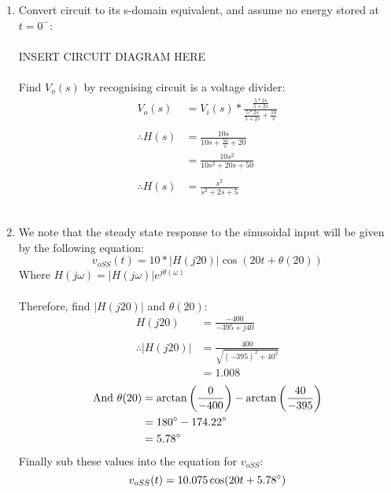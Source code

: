 \begin{enumerate}
	
	\item{
		Convert circuit to its s-domain equivalent, and assume no energy stored at $t=0^-$:
		\\ \\
		INSERT CIRCUIT DIAGRAM HERE
		\\ \\
		Find $V_o(s)$ by recognising circuit is a voltage divider:
		\begin{align*}
			V_o(s) &= V_i(s) * \frac{\frac{5*2s}{5+2s}}{\frac{5*2s}{5+2s} + \frac{10}{s}} \\ 
			\\
			\therefore H(s) &= \frac{10s}{10s+ \frac{50}{s} + 20} \\
			&= \frac{10s^2}{10s^2+20s+50} \\
			\\
			\therefore H(s) &= \frac{s^2}{s^2+2s+5}
		\end{align*}
		\\
	}

	\item{
		We note that the steady state response to the sinusoidal input will be given by the following equation:
		\begin{equation*}
			v_{oSS}(t) = 10 * |H(j20)| \cos(20t + \theta(20))
		\end{equation*}
		Where $H(j\omega) = |H(j\omega)|e^{j\theta(\omega)}$
		\\ \\
		Therefore, find $|H(j20)|$ and $\theta(20)$:
		\begin{align*}
			H(j20) &= \frac{-400}{-395+j40} \\
			\\
			\therefore |H(j20)| &= \frac{400}{\sqrt{(-395)^2+40^2}} \\
			&= 1.008
		\end{align*}
		\begin{align*}
			\mathrm{And} \ \theta(20) &= \arctan \left(\frac{0}{-400} \right) - \arctan \left(\frac{40}{-395} \right) \\
			&= 180\degree - 174.22\degree \\
			&= 5.78\degree
		\end{align*}
		Finally sub these values into the equation for $v_{oSS}$:
		\begin{equation*}
			v_{oSS}(t) = 10.075 \cos(20t+5.78\degree)
		\end{equation*}
		\\
	}
	
\end{enumerate}
